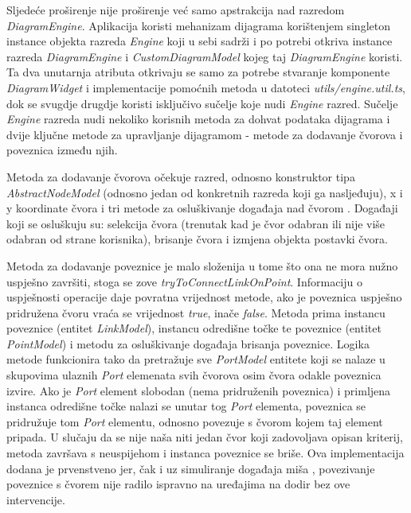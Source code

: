 \documentclass[times, utf8, diplomski, numeric]{fer}
\newcommand{\razmakp}{\vspace{18pt}}
\begin{document}
\razmakp

Sljedeće proširenje nije proširenje već samo apstrakcija nad razredom \emph{DiagramEngine}.
Aplikacija koristi mehanizam dijagrama korištenjem singleton instance objekta razreda \emph{Engine} koji u sebi sadrži i po potrebi otkriva instance razreda \emph{DiagramEngine} i \emph{CustomDiagramModel} kojeg taj \emph{DiagramEngine} koristi.
Ta dva unutarnja atributa otkrivaju se samo za potrebe stvaranje komponente \emph{DiagramWidget} i implementacije pomoćnih metoda u datoteci \emph{utils/engine.util.ts}, dok se svugdje drugdje koristi isključivo sučelje koje nudi \emph{Engine} razred.
Sučelje \emph{Engine} razreda nudi nekoliko korisnih metoda za dohvat podataka dijagrama i dvije ključne metode za upravljanje dijagramom - metode za dodavanje čvorova i poveznica između njih.

Metoda za dodavanje čvorova očekuje razred, odnosno konstruktor tipa \emph{AbstractNodeModel} (odnosno jedan od konkretnih razreda koji ga nasljeđuju), x i y koordinate čvora i tri metode za osluškivanje događaja nad čvorom .
Događaji koji se osluškuju su: selekcija čvora (trenutak kad je čvor odabran ili nije više odabran od strane korisnika), brisanje čvora i izmjena objekta postavki čvora.

Metoda za dodavanje poveznice je malo složenija u tome što ona ne mora nužno uspješno završiti, stoga se zove \emph{tryToConnectLinkOnPoint}.
Informaciju o uspješnosti operacije daje povratna vrijednost metode, ako je poveznica uspješno pridružena čvoru vraća se vrijednost \emph{true}, inače \emph{false}.
Metoda prima instancu poveznice (entitet \emph{LinkModel}), instancu odredišne točke te poveznice (entitet \emph{PointModel}) i metodu za osluškivanje događaja brisanja poveznice.
Logika metode funkcionira tako da pretražuje sve \emph{PortModel} entitete koji se nalaze u skupovima ulaznih \emph{Port} elemenata svih čvorova osim čvora odakle poveznica izvire.
Ako je \emph{Port} element slobodan (nema pridruženih poveznica) i primljena instanca odredišne točke nalazi se unutar tog \emph{Port} elementa, poveznica se pridružuje tom \emph{Port} elementu, odnosno povezuje s čvorom kojem taj element pripada.
U slučaju da se nije naša niti jedan čvor koji zadovoljava opisan kriterij, metoda završava s neuspijehom i instanca poveznice se briše.
Ova implementacija dodana je prvenstveno jer, čak i uz simuliranje događaja miša , povezivanje poveznice s čvorem nije radilo ispravno na uređajima na dodir bez ove intervencije.
\end{document}
